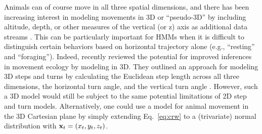 \documentclass[12pt]{article}\usepackage[]{graphicx}\usepackage[]{xcolor}
\begin{document}
Animals can of course move in all three spatial dimensions, and there has been increasing interest in modeling movements in 3D or ``pseudo-3D'' by including altitude, depth, or other measures of the vertical (or z) axis as additional data streams \citep[e.g.,][]{McClintockEtAl2013c,LaplancheEtAl2015,DeRuiterEtAl2017}. This can be particularly important for HMMs when it is difficult to distinguish certain behaviors based on horizontal trajectory alone (e.g., ``resting'' and ``foraging''). Indeed, \cite{LennoxEtAl2025} recently reviewed the potential for improved inferences in movement ecology by modeling in 3D. They outlined an approach for modeling 3D steps and turns by calculating the Euclidean step length across all three dimensions, the horizontal turn angle, and the vertical turn angle \citep[e.g.,][]{AHMED2021110728,KlappsteinEtAl2025,pritchard2025applying}. However, such a 3D model would still be subject to the same potential limitations of 2D step and turn models. Alternatively, one could use 
a model for animal movement in the 3D Cartesian plane by simply extending Eq.\ \ref{eq:crw} to a (trivariate) normal distribution with ${\bf x}_t = \left(x_t,y_t,z_t\right)$.
\end{document}
